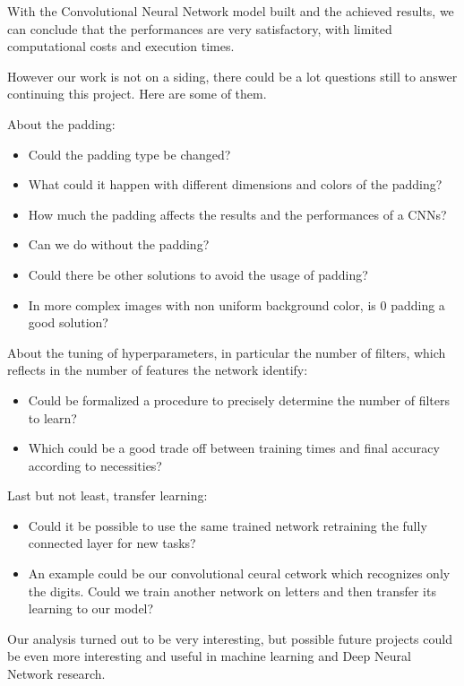 With the Convolutional Neural Network model built and the achieved results, we can conclude that the performances are very satisfactory, with limited computational costs and execution times.

However our work is not on a siding, there could be a lot questions still to answer continuing this project. Here are some of them.

About the padding:
\begin{itemize}
	\item Could the padding type be changed?
	\item What could it happen with different dimensions and colors of the padding?
	\item How much the padding affects the results and the performances of a \acsp{CNN}?
	\item Can we do without the padding?
	\item Could there be other solutions to avoid the usage of padding?
	\item In more complex images with non uniform background color, is 0 padding a good solution? 
\end{itemize}

About the tuning of hyperparameters, in particular the number of filters, which reflects in the number of features the network identify:
\begin{itemize}
	\item Could be formalized a procedure to precisely determine the number of filters to learn?
	\item Which could be a good trade off between training times and final accuracy according to necessities?
\end{itemize}

Last but not least, transfer learning:
\begin{itemize}
	\item Could it be possible to use the same trained network retraining the fully connected layer for new tasks?
	\item An example could be our convolutional ceural cetwork which recognizes only the digits. Could we train another network on letters and then transfer its learning to our model?
\end{itemize}

Our analysis turned out to be very interesting, but possible future projects could be even more interesting and useful in machine learning and Deep Neural Network research.